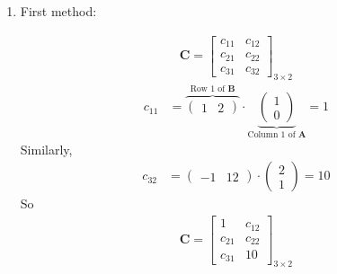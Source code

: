 \documentclass[11pt]{article}
\newcommand{\mat}[1]{\mathbf{#1}}
\begin{document}
\begin{enumerate}
\item{
First method:

\begin{align*}
\mat{C} = \begin{bmatrix}c_{11} & c_{12}\\c_{21} & c_{22}\\c_{31} & c_{32}\end{bmatrix}_{3 \times 2}
\end{align*}
\begin{align*}
c_{11} &= \overbrace{\begin{pmatrix}1 & 2\end{pmatrix}}^{\text{Row $1$ of $\mat{B}$}}
\cdot
\underbrace{\begin{pmatrix}1 \\ 0\end{pmatrix}}_{\text{Column $1$ of $\mat{A}$}}
 = 1
\end{align*}
Similarly,
\begin{align*}
c_{32} &=
\begin{pmatrix}-1 & 12\end{pmatrix}
\cdot \begin{pmatrix}2\\1\end{pmatrix} = 10
\end{align*}
So
\begin{align*}
\mat{C} = \begin{bmatrix}1 & c_{12}\\c_{21} & c_{22}\\c_{31} & 10\end{bmatrix}_{3 \times 2}
\end{align*}

}
\end{enumerate}
\end{document}
